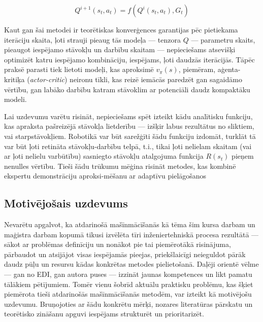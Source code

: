 \documentclass[12pt, a4paper]{article}
\numberwithin{equation}{section} %
\begin{document}
\begin{equation}
    Q^{i+1}(s_t,a_t)=f(Q^{i}(s_t, a_t), G_t)
\end{equation}

Kaut gan šai metodei ir teorētiskas konverģences garantijas pēc pietiekama iterāciju skaita, ļoti strauji pieaug tās modeļa --- tenzora $Q$ --- parametru skaits, pieaugot iespējamo stāvokļu un darbību skaitam --- nepieciešams atsevišķi optimizēt katru iespējamo kombināciju, iespējams, ļoti daudzās iterācijās. Tāpēc praksē parasti tiek lietoti modeļi, kas aproksimē $v_{\pi}(s)$, piemēram, aģenta-kritiķa (\textit{actor-critic}) neironu tīkli, kas reizē iemācās paredzēt gan sagaidāmo vērtību, gan labāko darbību katram stāvoklim ar potenciāli daudz kompaktāku modeli.

Lai uzdevumu varētu risināt, nepieciešams spēt izteikt kādu analītisku funkciju, kas apraksta pašreizējā stāvokļa lietderību --- izšķir labus rezultātus no sliktiem, vai starpstāvokļiem. Robotikā var būt sarežģīti šādu funkciju izdomāt, turklāt tā var būt ļoti retināta stāvokļu-darbību telpā, t.i., tikai ļoti nelielam skaitam (vai ar ļoti nelielu varbūtību) sasniegto stāvokļu atalgojuma funkcija $R(s_t)$ pieņem nenulles vērtību. Tieši šādu trūkumu mēģina risināt metodes, kas kombinē ekspertu demonstrāciju aproksi-mēšanu ar adaptīvu pielāgošanos \cite{nair2018overcoming}

\subsection{Motivējošais uzdevums}

Nevarētu apgalvot, ka atdarinošā mašīnmācīšanās kā tēma šim kursa darbam un maģistra darbam kopumā tikusi izvēlēta tīri inženiertehniskā procesa rezultātā --- sākot ar problēmas definīciju un nonākot pie tai piemērotākā risinājuma, pārbaudot un atsijājot visas iespējamās pieejas, priekšlaicīgi neieguldot pārāk daudz pūļu un resursu kādas konkrētas metodes pielietošanā. Daļēji orientē vēlme --- gan no EDI, gan autora puses --- izzināt jaunas kompetences un likt pamatu tālākiem pētījumiem. Tomēr vienu šobrīd aktuālu praktisku problēmu, kas šķiet piemērota tieši atdarinošās mašīnmācīšanās metodēm, var izteikt kā motivējošu uzdevumu. Bruņojoties ar šādu konkrētu mērķi, nozares literatūras pārskatu un teorētisko zināšanu apguvi iespējams strukturēt un prioritarizēt.
\end{document}
